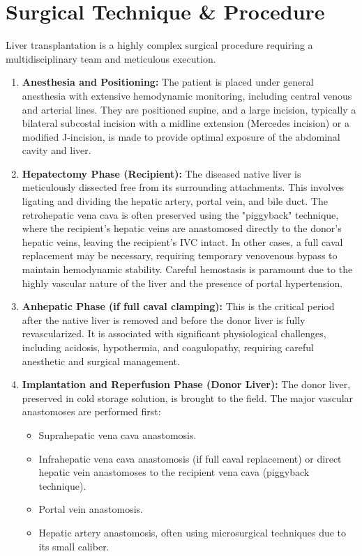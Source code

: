 \section*{Surgical Technique \& Procedure}
Liver transplantation is a highly complex surgical procedure requiring a multidisciplinary team and meticulous execution.
\begin{enumerate}
  \item \textbf{Anesthesia and Positioning:} The patient is placed under general anesthesia with extensive hemodynamic monitoring, including central venous and arterial lines. They are positioned supine, and a large incision, typically a bilateral subcostal incision with a midline extension (Mercedes incision) or a modified J-incision, is made to provide optimal exposure of the abdominal cavity and liver.
  \item \textbf{Hepatectomy Phase (Recipient):} The diseased native liver is meticulously dissected free from its surrounding attachments. This involves ligating and dividing the hepatic artery, portal vein, and bile duct. The retrohepatic vena cava is often preserved using the "piggyback" technique, where the recipient's hepatic veins are anastomosed directly to the donor's hepatic veins, leaving the recipient's IVC intact. In other cases, a full caval replacement may be necessary, requiring temporary venovenous bypass to maintain hemodynamic stability. Careful hemostasis is paramount due to the highly vascular nature of the liver and the presence of portal hypertension.
  \item \textbf{Anhepatic Phase (if full caval clamping):} This is the critical period after the native liver is removed and before the donor liver is fully revascularized. It is associated with significant physiological challenges, including acidosis, hypothermia, and coagulopathy, requiring careful anesthetic and surgical management.
  \item \textbf{Implantation and Reperfusion Phase (Donor Liver):} The donor liver, preserved in cold storage solution, is brought to the field. The major vascular anastomoses are performed first:
    \begin{itemize}
      \item Suprahepatic vena cava anastomosis.
      \item Infrahepatic vena cava anastomosis (if full caval replacement) or direct hepatic vein anastomoses to the recipient vena cava (piggyback technique).
      \item Portal vein anastomosis.
      \item Hepatic artery anastomosis, often using microsurgical techniques due to its small caliber.

\end{itemize}
\end{enumerate}
